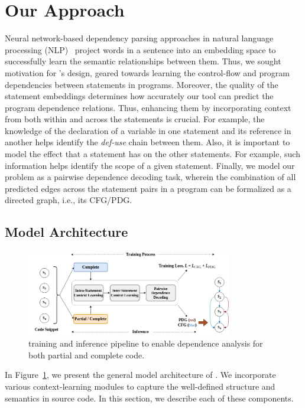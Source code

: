 \section{Our Approach}
\label{sec:approach}

Neural network-based dependency parsing approaches in natural language processing (NLP)~\cite{chen-manning-2014-fast} project words in a sentence into an embedding space to successfully learn the semantic relationships between them. Thus, we sought motivation for \tool's design, geared towards learning the control-flow and program dependencies between statements in programs. Moreover, the quality of the statement embeddings determines how accurately our tool can predict the program dependence relations. Thus, enhancing them by incorporating context from both within and across the statements is crucial. For example, the knowledge of the declaration of a variable in one statement and its reference in another helps identify the \textit{def-use} chain between them. Also, it is important to model the effect that a statement has on the other statements. For example, such information helps identify the scope of a given statement. Finally, we model our problem as a pairwise dependence decoding task, wherein the combination of all predicted edges across the statement pairs in a program can be formalized as a directed graph, i.e., its CFG/PDG.

\subsection{Model Architecture}
\label{sec:arch}

\begin{figure}[ht]
\begin{center}
    \includegraphics[width=0.8\textwidth]{icse23-demo-figures/demo-arch.png}
    \caption{\tool training and inference pipeline to enable dependence analysis for both partial and complete code.}
    \label{fig:model}
    \vspace{-10pt}
\end{center}
\end{figure}
In Figure~\ref{fig:model}, we present the general model architecture of \tool. We incorporate various context-learning modules to capture the well-defined structure and semantics in source code. In this section, we describe each of these components.

